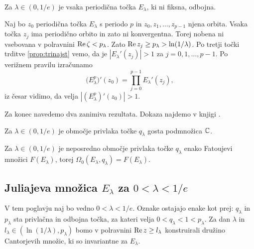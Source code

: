 \begin{posledica}
    Za \(\lambda \in (0, 1/e)\) je vsaka periodična točka \(E_\lambda\), ki ni fiksna, odbojna.
\end{posledica}

\begin{dokaz}
    Naj bo \(z_0\) periodična točka \(E_\lambda\) s periodo \(p\) in \(z_0, z_1, \dots, z_{p - 1}\) njena orbita. Vsaka točka \(z_j\) ima periodično orbito in zato ni konvergentna. Torej nobena ni vsebovana v polravnini \(\operatorname{Re} \zeta < p_\lambda\). Zato \(\operatorname{Re} z_j \geq p_\lambda > \ln (1 / \lambda)\). Po tretji točki trditve \ref{prop:trinajst} vemo, da je \(|E_\lambda' (z_j)| > 1\) za \(j = 0, 1, \dots, p - 1\). Po verižnem pravilu izračunamo
    \[\bigl( E_\lambda^p \bigr)' (z_0) = \prod_{j = 0}^{p - 1} E_\lambda' (z_j),\]
    iz česar vidimo, da velja \(|(E_\lambda^p)' (z_0)| > 1\).
\end{dokaz}

Za konec navedemo dva zanimiva rezultata. Dokaza najdemo v knjigi \cite[trditev 9.1.7, izrek 9.1.8]{Pineiro_2025}.

\begin{trditev}
    Za \(\lambda \in (0, 1/e)\) je območje privlaka točke \(q_\lambda\) gosta podmnožica \(\mathbb C\).
\end{trditev}

\begin{izrek}
    Za \(\lambda \in (0, 1/e)\) je neposredno območje privlaka točke \(q_\lambda\) enako Fatoujevi množici \(F (E_\lambda)\), torej \(\Omega_0 (E_\lambda, q_\lambda) = F (E_\lambda)\).
\end{izrek}

\subsection{Juliajeva množica \texorpdfstring{\(E_\lambda\)}{E\_\lambda} za \texorpdfstring{\(0 < \lambda < 1/e\)}{0 < \lambda < 1/e}}

V tem poglavju naj bo vedno \(0 < \lambda < 1/e\). Oznake ostajajo enake kot prej: \(q_\lambda\) in \(p_\lambda\) sta privlačna in odbojna točka, za kateri velja \(0 < q_\lambda < 1 < p_\lambda\). Za dan \(\lambda\) in \(l_\lambda \in (\ln (1 / \lambda), p_\lambda)\) bomo v polravnini \(\operatorname{Re} z \geq l_\lambda\) konstruirali družino Cantorjevih množic, ki so invariantne za \(E_\lambda\).

